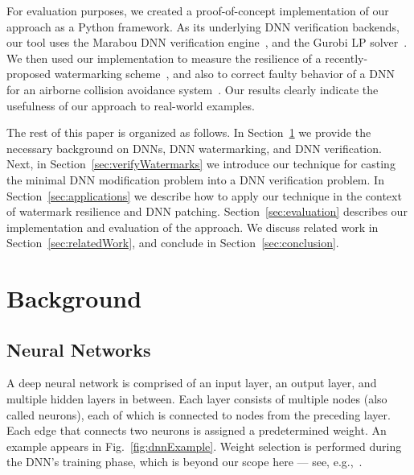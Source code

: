 \documentclass{easychair}
\begin{document}
\medskip

For evaluation purposes, we created a proof-of-concept implementation
of our approach as a Python framework. As its underlying DNN
verification backends, our
tool uses the Marabou DNN verification
engine~\cite{KaHuIbJuLaLiShThWuZeDiKoBa19Marabou}, and the Gurobi LP
solver~\cite{gurobi}. We then used our implementation to measure the resilience
of a recently-proposed watermarking
scheme~\cite{AdBaPiKeWatermarking}, and also to correct faulty
behavior of a DNN for an airborne collision avoidance
system~\cite{JuLoBrOwKo16,KaBaDiJuKo17Reluplex}. Our results clearly
indicate the usefulness of our approach to real-world examples.

The rest of this paper is organized as follows. In
Section~\ref{sec:background} we provide the necessary background on
DNNs, DNN watermarking, and DNN verification. Next, in
Section~\ref{sec:verifyWatermarks} we introduce our technique for
casting the minimal DNN modification problem into a DNN verification
problem. In Section~\ref{sec:applications} we describe how to apply 
our technique in the context of watermark resilience and DNN patching.
Section~\ref{sec:evaluation} describes our implementation and
evaluation of the approach.
We discuss related work in Section~\ref{sec:relatedWork},
and conclude in Section~\ref{sec:conclusion}.

\section{Background}
\label{sec:background}

\subsection{Neural Networks}
A deep neural network is comprised of an input layer, an output layer,
and multiple hidden layers in between. Each layer consists of multiple
nodes (also called neurons), each of which is connected to nodes from
the preceding layer. Each edge that connects two neurons is assigned a
predetermined weight. An example appears in
Fig.~\ref{fig:dnnExample}. Weight selection
is performed during the DNN's training phase, which is beyond our
scope here --- see, e.g.,~\cite{FoBeCu16}. 
\end{document}
